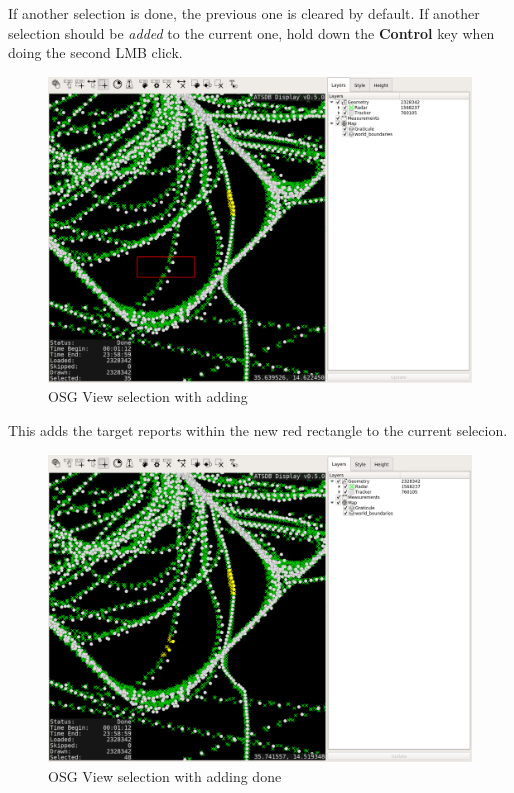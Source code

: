 If another selection is done, the previous one is cleared by default. If another selection should be \textit{added} to the current one, hold down the \textbf{Control} key when doing the second LMB click.

\begin{figure}[H]
    \hspace*{-2.5cm}
    \includegraphics[width=19cm,frame]{figures/osgview_select_add1.png}
  \caption{OSG View selection with adding}
\end{figure}

This adds the target reports within the new red rectangle to the current selecion.

\begin{figure}[H]
    \hspace*{-2.5cm}
    \includegraphics[width=19cm,frame]{figures/osgview_select_add2.png}
  \caption{OSG View selection with adding done}
\end{figure}

